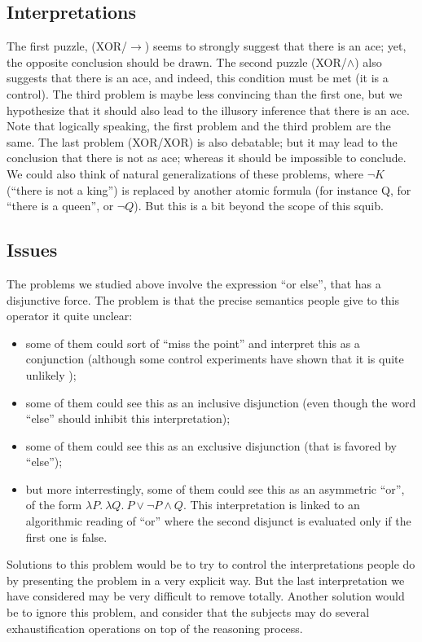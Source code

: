 \documentclass[french]{article}
\begin{document}
\subsection{Interpretations}
The first puzzle, (XOR/$\rightarrow$) seems to strongly suggest that there is an ace; yet, the opposite conclusion should be drawn. The second puzzle (XOR/$\wedge$) also suggests that there is an ace, and  indeed, this condition must be met (it is a control). The third problem is maybe less convincing than the first one, but we hypothesize that it should also lead to the illusory inference that there is an ace. Note that logically speaking, the first problem and the third problem are the same. The last problem (XOR/XOR) is also debatable; but it may lead to the conclusion that there is not as ace; whereas it should be impossible to conclude.\\
We could also think of natural generalizations of these problems, where $\neg K$ (``there is not a king'') is replaced by another atomic formula (for instance Q, for ``there is a queen'', or $\neg Q$). But this is a bit beyond the scope of this squib.
\subsection{Issues}
The problems we studied above involve the expression ``or else'', that has a disjunctive force. The problem is that the precise semantics people give to this operator it quite unclear:
\begin{itemize}
	\item some of them could sort of ``miss the point'' and interpret this as a conjunction (although some control experiments have shown that it is quite unlikely \cite{johnsonlaird1999});
	\item some of them could see this as an inclusive disjunction (even though the word ``else'' should inhibit this interpretation);
	\item some of them could see this as an exclusive disjunction (that is favored by ``else'');
	\item but more interrestingly, some of them could see this as an asymmetric ``or'', of the form $\lambda P. \ \lambda Q. \ P \vee \neg P \wedge Q $. This interpretation is linked to an algorithmic reading of ``or'' where the second disjunct is evaluated only if the first one is false.
\end{itemize} 
Solutions to this problem would be to try to control the interpretations people do by presenting the problem in a very explicit way. But the last interpretation we have considered may be very difficult to remove totally. Another solution would be to ignore this problem, and consider that the subjects may do several exhaustification operations on top of the reasoning process.\\
\end{document}
